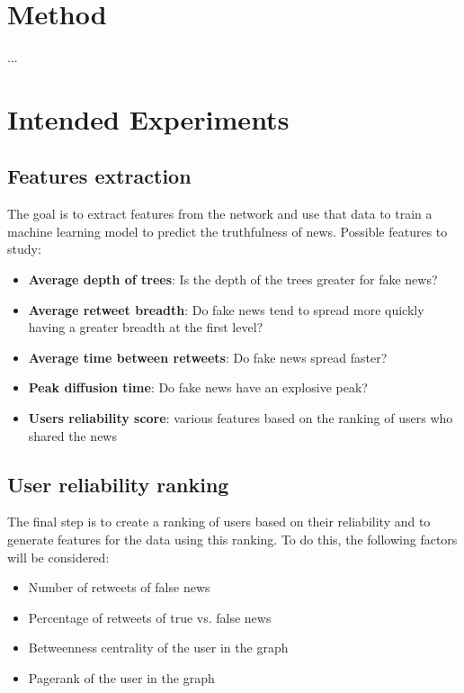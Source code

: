 \documentclass[11pt,a4paper]{article}
\begin{document}
\section*{Method}

...

\section*{Intended Experiments}

\subsection*{Features extraction}

The goal is to extract features from the network and use that data to train a machine learning model to predict the truthfulness of news.
Possible features to study:
\begin{itemize}
	\setlength\itemsep{-0.3em}
	\item \textbf{Average depth of trees}: Is the depth of the trees greater for fake news?
	\item \textbf{Average retweet breadth}: Do fake news tend to spread more quickly having a greater breadth at the first level?
	\item \textbf{Average time between retweets}: Do fake news spread faster?
	\item \textbf{Peak diffusion time}: Do fake news have an explosive peak?
	\item \textbf{Users reliability score}: various features based on the ranking of users who shared the news
\end{itemize}

\subsection*{User reliability ranking}
The final step is to create a ranking of users based on their reliability and to generate features for the data using this ranking. To do this, the following factors will be considered:
\begin{itemize}
	\setlength\itemsep{-0.3em}
	\item Number of retweets of false news
	\item Percentage of retweets of true vs. false news
	\item Betweenness centrality of the user in the graph
	\item Pagerank of the user in the graph
\end{itemize}
\end{document}
